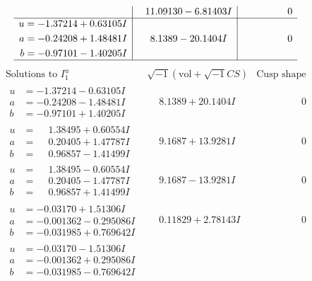 \documentclass[1p]{elsarticle_modified}
\theoremstyle{definition}
\newcommand{\I}{\sqrt{-1}}
\begin{document}
$$\begin{array}{c|c|c}
 & \phantom{-}11.09130 - 6.81403 I & \phantom{-0.000000 } 0 \\ \hline\begin{aligned}
u &= -1.37214 + 0.63105 I \\
a &= -0.24208 + 1.48481 I \\
b &= -0.97101 - 1.40205 I\end{aligned}
 & \phantom{-}8.1389 - 20.1404 I & \phantom{-0.000000 } 0\\
 \hline 
 \end{array}$$\newpage$$\begin{array}{c|c|c}  
\text{Solutions to }I^u_{1}& \I (\text{vol} + \sqrt{-1}CS) & \text{Cusp shape}\\
 \hline 
\begin{aligned}
u &= -1.37214 - 0.63105 I \\
a &= -0.24208 - 1.48481 I \\
b &= -0.97101 + 1.40205 I\end{aligned}
 & \phantom{-}8.1389 + 20.1404 I & \phantom{-0.000000 } 0 \\ \hline\begin{aligned}
u &= \phantom{-}1.38495 + 0.60554 I \\
a &= \phantom{-}0.20405 + 1.47787 I \\
b &= \phantom{-}0.96857 - 1.41499 I\end{aligned}
 & \phantom{-}9.1687 + 13.9281 I & \phantom{-0.000000 } 0 \\ \hline\begin{aligned}
u &= \phantom{-}1.38495 - 0.60554 I \\
a &= \phantom{-}0.20405 - 1.47787 I \\
b &= \phantom{-}0.96857 + 1.41499 I\end{aligned}
 & \phantom{-}9.1687 - 13.9281 I & \phantom{-0.000000 } 0 \\ \hline\begin{aligned}
u &= -0.03170 + 1.51306 I \\
a &= -0.001362 - 0.295086 I \\
b &= -0.031985 + 0.769642 I\end{aligned}
 & \phantom{-}0.11829 + 2.78143 I & \phantom{-0.000000 } 0 \\ \hline\begin{aligned}
u &= -0.03170 - 1.51306 I \\
a &= -0.001362 + 0.295086 I \\
b &= -0.031985 - 0.769642 I\end{aligned}

\end{array}$$
\end{document}
